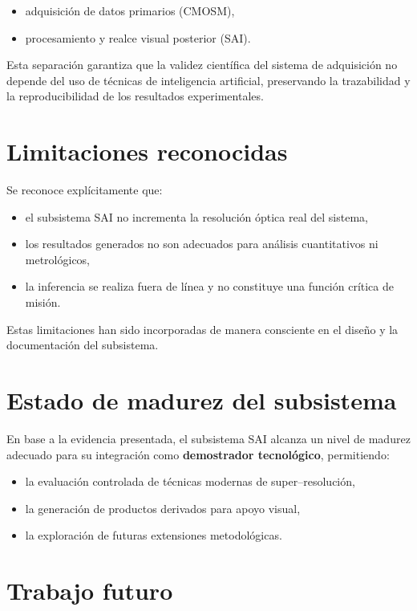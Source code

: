 \begin{itemize}
    \item adquisición de datos primarios (CMOSM),
    \item procesamiento y realce visual posterior (SAI).
\end{itemize}

Esta separación garantiza que la validez científica del sistema de adquisición
no depende del uso de técnicas de inteligencia artificial, preservando la
trazabilidad y la reproducibilidad de los resultados experimentales.

\section{Limitaciones reconocidas}

Se reconoce explícitamente que:

\begin{itemize}
    \item el subsistema SAI no incrementa la resolución óptica real del sistema,
    \item los resultados generados no son adecuados para análisis cuantitativos
    ni metrológicos,
    \item la inferencia se realiza fuera de línea y no constituye una función
    crítica de misión.
\end{itemize}

Estas limitaciones han sido incorporadas de manera consciente en el diseño y la
documentación del subsistema.

\section{Estado de madurez del subsistema}

En base a la evidencia presentada, el subsistema SAI alcanza un nivel de madurez
adecuado para su integración como \textbf{demostrador tecnológico}, permitiendo:

\begin{itemize}
    \item la evaluación controlada de técnicas modernas de super--resolución,
    \item la generación de productos derivados para apoyo visual,
    \item la exploración de futuras extensiones metodológicas.
\end{itemize}

\section{Trabajo futuro}

